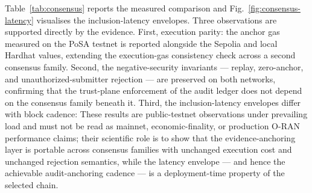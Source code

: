 Table~\ref{tab:consensus} reports the measured comparison and
Fig.~\ref{fig:consensus-latency} visualises the inclusion-latency
envelopes. Three observations are supported directly by the evidence.
First, execution parity: the anchor gas measured on the PoSA testnet is
reported alongside the Sepolia and local Hardhat values, extending the
execution-gas consistency check across a second consensus family.
Second, the negative-security invariants --- replay, zero-anchor, and
unauthorized-submitter rejection --- are preserved on both networks,
confirming that the trust-plane enforcement of the audit ledger does not
depend on the consensus family beneath it. Third, the inclusion-latency
envelopes differ with block cadence:
These results are public-testnet observations under prevailing load and
must not be read as mainnet, economic-finality, or production O-RAN
performance claims; their scientific role is to show that the
evidence-anchoring layer is portable across consensus families with
unchanged execution cost and unchanged rejection semantics, while the
latency envelope --- and hence the achievable audit-anchoring cadence ---
is a deployment-time property of the selected chain.



